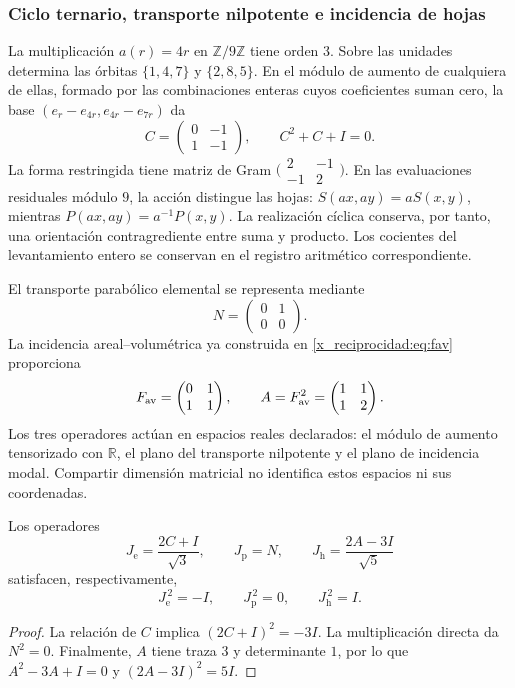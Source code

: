 \subsubsection{Ciclo ternario, transporte nilpotente e incidencia de hojas}

La multiplicación \(a(r)=4r\) en \(\mathbb Z/9\mathbb Z\) tiene orden
\(3\). Sobre las unidades determina las órbitas \(\{1,4,7\}\) y
\(\{2,8,5\}\). En el módulo de aumento de cualquiera de ellas, formado por
las combinaciones enteras cuyos coeficientes suman cero, la base
\((e_r-e_{4r},e_{4r}-e_{7r})\) da
\[
 C=\begin{pmatrix}0&-1\\1&-1\end{pmatrix},
 \qquad C^2+C+I=0.
\]
La forma restringida tiene matriz de Gram
\(\bigl(\begin{smallmatrix}2&-1\\-1&2\end{smallmatrix}\bigr)\).
En las evaluaciones residuales módulo \(9\), la acción distingue las hojas:
\(S(ax,ay)=aS(x,y)\), mientras \(P(ax,ay)=a^{-1}P(x,y)\).
La realización cíclica conserva, por tanto, una orientación contragrediente
entre suma y producto. Los cocientes del levantamiento entero se conservan
en el registro aritmético correspondiente.

El transporte parabólico elemental se representa mediante
\[
 N=\begin{pmatrix}0&1\\0&0\end{pmatrix}.
\]
La incidencia areal--volumétrica ya construida en \eqref{x_reciprocidad:eq:fav} proporciona
\[
 F_{\rm av}=\begin{pmatrix}0&1\\1&1\end{pmatrix},
 \qquad A=F_{\rm av}^2=\begin{pmatrix}1&1\\1&2\end{pmatrix}.
\]
Los tres operadores actúan en espacios reales declarados: el módulo de
aumento tensorizado con \(\mathbb R\), el plano del transporte nilpotente y
el plano de incidencia modal. Compartir dimensión matricial no identifica
estos espacios ni sus coordenadas.

\begin{proposition}
\label{x_reciprocidad:euler-trit-generadores}
Los operadores
\[
 J_{\mathrm e}=\frac{2C+I}{\sqrt3},\qquad
 J_{\mathrm p}=N,\qquad
 J_{\mathrm h}=\frac{2A-3I}{\sqrt5}
\]
satisfacen, respectivamente,
\[
 J_{\mathrm e}^{\,2}=-I,\qquad
 J_{\mathrm p}^{\,2}=0,\qquad
 J_{\mathrm h}^{\,2}=I.
\]
\end{proposition}
\begin{proof}
La relación de \(C\) implica \((2C+I)^2=-3I\).
La multiplicación directa da \(N^2=0\).
Finalmente, \(A\) tiene traza \(3\) y determinante \(1\), por lo que
\(A^2-3A+I=0\) y \((2A-3I)^2=5I\).
\end{proof}

